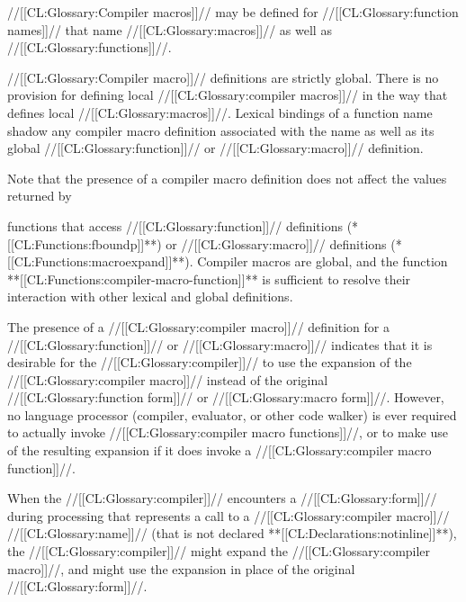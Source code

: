 \endsubsubsubsection%

 
//[[CL:Glossary:Compiler macros]]// may be defined for //[[CL:Glossary:function names]]// that name
//[[CL:Glossary:macros]]// as well as //[[CL:Glossary:functions]]//.  






//[[CL:Glossary:Compiler macro]]// definitions are strictly global.  There is no provision
for defining local //[[CL:Glossary:compiler macros]]// in the way that 
defines local //[[CL:Glossary:macros]]//.  Lexical bindings of a function name shadow any
compiler macro definition associated with the name as well as its 
global //[[CL:Glossary:function]]// or //[[CL:Glossary:macro]]// definition.
 
Note that the presence of a compiler macro definition does not affect
the values returned by


functions that access //[[CL:Glossary:function]]// definitions (\eg **[[CL:Functions:fboundp]]**)
or //[[CL:Glossary:macro]]// definitions (\eg **[[CL:Functions:macroexpand]]**).
Compiler macros are global, and the function
**[[CL:Functions:compiler-macro-function]]** is sufficient to resolve their interaction
with other lexical and global definitions.

\endsubsubsubsection%


The presence of a //[[CL:Glossary:compiler macro]]// definition for a //[[CL:Glossary:function]]// or //[[CL:Glossary:macro]]//
indicates that it is desirable for the //[[CL:Glossary:compiler]]// to use the expansion
of the //[[CL:Glossary:compiler macro]]// instead of the original //[[CL:Glossary:function form]]// or
//[[CL:Glossary:macro form]]//.  However, no language processor
(compiler, evaluator, or other code walker) is ever required to actually
invoke //[[CL:Glossary:compiler macro functions]]//, or to 
make use of the resulting expansion if it does invoke 
a //[[CL:Glossary:compiler macro function]]//.

When the //[[CL:Glossary:compiler]]// encounters a //[[CL:Glossary:form]]// during processing that represents
a call to a //[[CL:Glossary:compiler macro]]// //[[CL:Glossary:name]]// (that is not declared **[[CL:Declarations:notinline]]**),
the //[[CL:Glossary:compiler]]// might expand the //[[CL:Glossary:compiler macro]]//, 
and might use the expansion in place of the original //[[CL:Glossary:form]]//.

